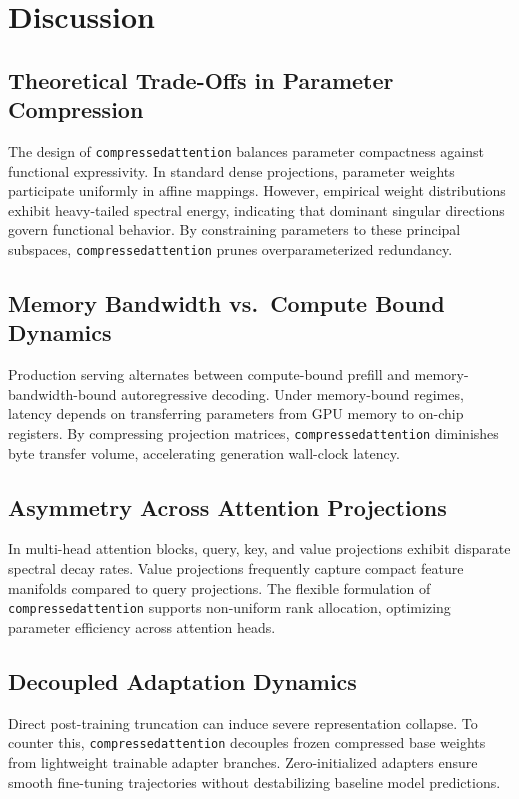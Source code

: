 \section{Discussion}

\subsection{Theoretical Trade-Offs in Parameter Compression}
The design of \texttt{compressedattention} balances parameter compactness against functional expressivity. In standard dense projections, parameter weights participate uniformly in affine mappings. However, empirical weight distributions exhibit heavy-tailed spectral energy, indicating that dominant singular directions govern functional behavior. By constraining parameters to these principal subspaces, \texttt{compressedattention} prunes overparameterized redundancy.

\subsection{Memory Bandwidth vs.\ Compute Bound Dynamics}
Production serving alternates between compute-bound prefill and memory-bandwidth-bound autoregressive decoding. Under memory-bound regimes, latency depends on transferring parameters from GPU memory to on-chip registers. By compressing projection matrices, \texttt{compressedattention} diminishes byte transfer volume, accelerating generation wall-clock latency.

\subsection{Asymmetry Across Attention Projections}
In multi-head attention blocks, query, key, and value projections exhibit disparate spectral decay rates. Value projections frequently capture compact feature manifolds compared to query projections. The flexible formulation of \texttt{compressedattention} supports non-uniform rank allocation, optimizing parameter efficiency across attention heads.

\subsection{Decoupled Adaptation Dynamics}
Direct post-training truncation can induce severe representation collapse. To counter this, \texttt{compressedattention} decouples frozen compressed base weights from lightweight trainable adapter branches. Zero-initialized adapters ensure smooth fine-tuning trajectories without destabilizing baseline model predictions.

